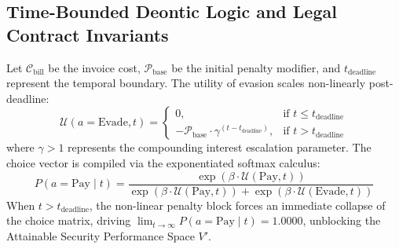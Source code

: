 \documentclass[11pt,fleqn]{article}
\begin{document}
\subsection{Time-Bounded Deontic Logic and Legal Contract Invariants}
Let $\mathcal{C}_{\text{bill}}$ be the invoice cost, $\mathcal{P}_{\text{base}}$ be the initial penalty modifier, and $t_{\text{deadline}}$ represent the temporal boundary. The utility of evasion scales non-linearly post-deadline:
\begin{equation}
\mathcal{U}(a = \text{Evade}, t) = 
\begin{cases} 
0, & \text{if } t \le t_{\text{deadline}} \\
-\mathcal{P}_{\text{base}} \cdot \gamma^{(t - t_{\text{deadline}})}, & \text{if } t > t_{\text{deadline}}
\end{cases}
\end{equation}
where $\gamma > 1$ represents the compounding interest escalation parameter. The choice vector is compiled via the exponentiated softmax calculus:
\begin{equation}
P(a = \text{Pay} \mid t) = \frac{\exp\left( \beta \cdot \mathcal{U}(\text{Pay}, t) \right)}{\exp\left( \beta \cdot \mathcal{U}(\text{Pay}, t) \right) + \exp\left( \beta \cdot \mathcal{U}(\text{Evade}, t) \right)}
\end{equation}
When $t > t_{\text{deadline}}$, the non-linear penalty block forces an immediate collapse of the choice matrix, driving $\lim_{t \to \infty} P(a = \text{Pay} \mid t) = 1.0000$, unblocking the Attainable Security Performance Space $V'$.
\end{document}
